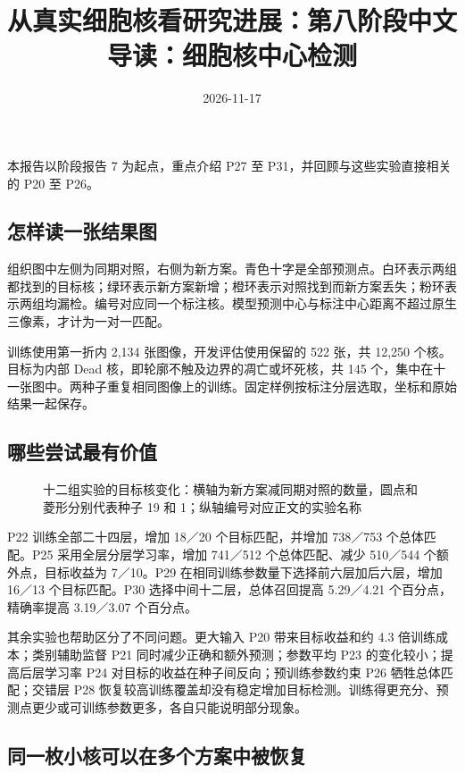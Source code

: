 \documentclass[
  11pt,
  fontset=fandol]{ctexart}
\title{从真实细胞核看研究进展：第八阶段中文导读：细胞核中心检测}
\author{}
\date{2026-11-17}
\begin{document}
\maketitle

{
\setcounter{tocdepth}{2}
\tableofcontents
}
本报告以阶段报告 7 为起点，重点介绍 P27 至
P31，并回顾与这些实验直接相关的 P20 至 P26。

\subsection{怎样读一张结果图}\label{ux600eux6837ux8bfbux4e00ux5f20ux7ed3ux679cux56fe}

组织图中左侧为同期对照，右侧为新方案。青色十字是全部预测点。白环表示两组都找到的目标核；绿环表示新方案新增；橙环表示对照找到而新方案丢失；粉环表示两组均漏检。编号对应同一个标注核。模型预测中心与标注中心距离不超过原生三像素，才计为一对一匹配。

训练使用第一折内 2,134 张图像，开发评估使用保留的 522 张，共 12,250
个核。目标为内部 Dead 核，即轮廓不触及边界的凋亡或坏死核，共 145
个，集中在十一张图中。两种子重复相同图像上的训练。固定样例按标注分层选取，坐标和原始结果一起保存。

\subsection{哪些尝试最有价值}\label{ux54eaux4e9bux5c1dux8bd5ux6700ux6709ux4ef7ux503c}

\begin{figure}[H]\centering

\caption{十二组实验的目标核变化：横轴为新方案减同期对照的数量，圆点和菱形分别代表种子 19 和 1；纵轴编号对应正文的实验名称}
\end{figure}

P22 训练全部二十四层，增加 18／20 个目标匹配，并增加 738／753
个总体匹配。P25 采用全层分层学习率，增加 741／512 个总体匹配、减少
510／544 个额外点，目标收益为 7／10。P29
在相同训练参数量下选择前六层加后六层，增加 16／13 个目标匹配。P30
选择中间十二层，总体召回提高 5.29／4.21 个百分点，精确率提高 3.19／3.07
个百分点。

其余实验也帮助区分了不同问题。更大输入 P20 带来目标收益和约 4.3
倍训练成本；类别辅助监督 P21 同时减少正确和额外预测；参数平均 P23
的变化较小；提高后层学习率 P24 对目标的收益在种子间反向；预训练参数约束
P26 牺牲总体匹配；交错层 P28
恢复较高训练覆盖却没有稳定增加目标检测。训练得更充分、预测点更少或可训练参数更多，各自只能说明部分现象。

\subsection{同一枚小核可以在多个方案中被恢复}\label{ux540cux4e00ux679aux5c0fux6838ux53efux4ee5ux5728ux591aux4e2aux65b9ux6848ux4e2dux88abux6062ux590d}
\end{document}
